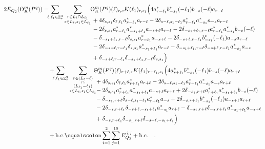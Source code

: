 \documentclass[sn-mathphys, Numbered ,a4paper]{sn-jnl}%
\DeclareMathOperator{\Z}{\mathbb{Z}}
\theoremstyle{plain}
\theoremstyle{definition}
\theoremstyle{remark}
\theoremstyle{plain}
\theoremstyle{definition}
\theoremstyle{remark}
\begin{document}
\begin{alignat}{2}
	2E_{Q_2}(\Theta^m_{K}(P^q)) &=
	\!\!\!\sum\limits_{\ell,\ell_1 \in \Z^3_*}\sum\limits_{\substack{r\in L_{\ell} \cap L_{\ell_1}\\ s \in L_{\ell},s_1\in L_{\ell_1}}} \!\!\!\begin{aligned}[t] &\Theta^m_{K}(P^q)(\ell)_{r,s}K(\ell_1)_{r,s_1}\Big( 4a^*_{r-\ell_1}b^*_{-s_1}(-\ell_1)b_{-s}(-\ell)a_{r-\ell} \nonumber\\ 
		&\;+ 4\delta_{s,s_1} \delta_{\ell,\ell_1 } a^*_{r-\ell_1} a_{r-\ell} -2\delta_{s-\ell,s_1-\ell_1}a^*_{r-\ell_1} a^*_{-s_1} a_{-s} a_{r-\ell} \nonumber\\
		&\;-2\delta_{s,s_1}a^*_{r-\ell_1} a^*_{-s_1+\ell_1}a_{-s+\ell} a_{r-\ell} - 2\delta_{-s_1+\ell_1,r-\ell} a^*_{r-\ell_1} a^*_{-s_1} b_{-s}(-\ell)\nonumber\\
		&\;-\delta_{-s_1+\ell_1,r-\ell}\delta_{s,s_1}a^*_{r-\ell_1}a_{-s+\ell} - 2\delta_{-s+\ell,r-\ell_1}b^*_{-s_1}(-\ell_1)a_{-s}a_{r-\ell} \nonumber\\
		&\;-2\delta_{-s+\ell,r-\ell_1}\delta_{s,s_1}a^*_{-s_1+\ell_1} a_{r-\ell} - \delta_{-s_1+\ell_1,r-\ell}\delta_{-s+\ell,r-\ell_1}a^*_{-s_1}a_{-s} \nonumber\\
		&\;+\delta_{-s+\ell,r-\ell_1}\delta_{-s_1+\ell_1,r-\ell}\delta_{s,s_1}  \Big)    
	\end{aligned}\\
	&\quad +\!\!\!\sum\limits_{\ell,\ell_1 \in \Z^3_*}\sum\limits_{\substack{r\in (L_{\ell}-\ell)\\ \cap \\(L_{\ell_1}-\ell_1)\\ s \in L_{\ell},s_1\in L_{\ell_1}}}\!\!\!\!\!\begin{aligned}[t] &\Theta^m_{K}(P^q)(\ell)_{r+\ell,s}K(\ell_1)_{r+\ell_1,s_1}\Big(4a^*_{r+\ell_1}b^*_{-s_1}(-\ell_1)b_{-s}(-\ell)a_{r+\ell} \nonumber\\
		&\;+ 4\delta_{s,s_1} \delta_{\ell,\ell_1 } a^*_{r+\ell_1} a_{r+\ell} -2\delta_{s-\ell,s_1-\ell_1}a^*_{r+\ell_1} a^*_{-s_1} a_{-s} a_{r+\ell} \nonumber\\
		&\;-2\delta_{s,s_1}a^*_{r+\ell_1} a^*_{-s_1+\ell_1}a_{-s+\ell} a_{r+\ell} + 2 \delta_{-s_1, r+\ell}a^*_{r+\ell_1}a^*_{-s_1+\ell_1}b_{-s}(-\ell)\nonumber\\
		&\;-\delta_{-s_1,r+\ell}\delta_{s-\ell,s_1-\ell_1}a^*_{r+\ell_1}a_{-s} + 2\delta_{-s,r+\ell_1}b^*_{-s_1}(-\ell_1)a_{-s+\ell}a_{r+\ell} \nonumber\\
		&\;-2\delta_{-s,r+\ell_1}\delta_{-s+\ell,-s_1+\ell_1}a^*_{-s_1}a_{r+\ell} - \delta_{-s_1,r+\ell}\delta_{-s,r+\ell_1}a^*_{-s_1+\ell_1}a_{-s+\ell}\nonumber\\
		&\;+ \delta_{-s,r+\ell_1} \delta_{-s_1,r+\ell} \delta_{-s+\ell,-s_1+\ell_1} \Big)  
	\end{aligned}\\
	&\quad +\mathrm{h.c.} \equalscolon \sum\limits_{i=1}^{2}\sum\limits_{j=1}^{10} E_{Q_2}^{\,i,j} + \mathrm{h.c.} \nonumber\quad.
\end{alignat}
\end{document}
